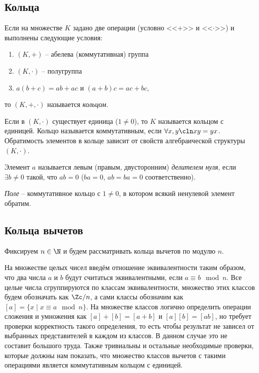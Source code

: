 \subsection{Кольца}

\begin{df}
  Если на множестве $K$ задано две операции (условно <<$+$>> и <<$\cdot$>>) и выполнены следующие условия:
  \begin{enumerate}
    \item $(K,+)$ -- абелева (коммутативная) группа
    \item $(K,\cdot)$ -- полугруппа
    \item $a(b+c)=ab+ac$ и $(a+b)c=ac+bc$,
  \end{enumerate}
  то $(K,+,\cdot)$ называется \emph{кольцом}.

  Если в $(K,\cdot)$ существует единица ($1\ne0$), то $K$ называется кольцом с единицей. Кольцо называется коммутативным, если $\forall x,y\cln xy=yx$. Обратимость элементов в кольце зависит от свойств алгебраической структуры $(K,\cdot)$.
\end{df}

\begin{df}
  Элемент $a$ называется левым (правым, двусторонним) \emph{делителем нуля}, если $\exists b\ne0$ такой, что $ab=0$ ($ba=0$, $ab=ba=0$ соответственно).
\end{df}

\begin{df}
  \emph{Поле} -- коммутативное кольцо с $1\ne0$, в котором всякий ненулевой элемент обратим.
\end{df}


\subsection{Кольца вычетов}

Фиксируем $n\in \N$ и будем рассматривать кольца вычетов по модулю $n$.

На множестве целых чисел введём отношение эквивалентности таким
образом, что два числа $a$ и $b$ будут считаться эквивалентными, если
$a\equiv b \mod n$. Все целые числа сгруппируются по классам
эквивалентности, множество этих классов будем обозначать как $\Zc/n$,
а сами классы обозначим как $[a]=\{x\mid x\equiv a \mod n\}$. На
множестве классов логично определить операции сложения и умножения как
$[a]+[b]=[a+b]$ и $[a][b]=[ab]$, но требует проверки корректность
такого определения, то есть чтобы результат не зависел от выбранных
представителей в каждом из классов. В данном случае это не составит
большого труда. Также тривиальны и остальные необходимые проверки,
которые должны нам показать, что множество классов вычетов с такими
операциями является коммутативным кольцом с
единицей.

